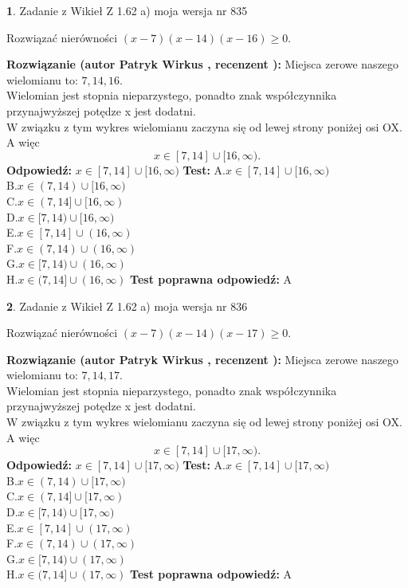 \documentclass[12pt, a4paper]{article}
\theoremstyle{definition} %
\newtheorem{zad}{}
\newcommand{\zadStart}[1]{\begin{zad}#1\newline}
\newcommand{\zadStop}{\end{zad}}
\newcommand{\rozwStart}[2]{\noindent \textbf{Rozwiązanie (autor #1 , recenzent #2): }\newline}
\newcommand{\rozwStop}{\newline}
\newcommand{\odpStart}{\noindent \textbf{Odpowiedź:}\newline}
\newcommand{\odpStop}{\newline}
\newcommand{\testStart}{\noindent \textbf{Test:}\newline}
\newcommand{\testStop}{\newline}
\newcommand{\kluczStart}{\noindent \textbf{Test poprawna odpowiedź:}\newline}
\newcommand{\kluczStop}{\newline}
\begin{document}
\zadStart{Zadanie z Wikieł Z 1.62 a) moja wersja nr 835}

Rozwiązać nierówności $(x-7)(x-14)(x-16)\ge0$.
\zadStop
\rozwStart{Patryk Wirkus}{}
Miejsca zerowe naszego wielomianu to: $7, 14, 16$.\\
Wielomian jest stopnia nieparzystego, ponadto znak współczynnika przy\linebreak najwyższej potędze x jest dodatni.\\ W związku z tym wykres wielomianu zaczyna się od lewej strony poniżej osi OX. A więc $$x \in [7,14] \cup [16,\infty).$$
\rozwStop
\odpStart
$x \in [7,14] \cup [16,\infty)$
\odpStop
\testStart
A.$x \in [7,14] \cup [16,\infty)$\\
B.$x \in (7,14) \cup [16,\infty)$\\
C.$x \in (7,14] \cup [16,\infty)$\\
D.$x \in [7,14) \cup [16,\infty)$\\
E.$x \in [7,14] \cup (16,\infty)$\\
F.$x \in (7,14) \cup (16,\infty)$\\
G.$x \in [7,14) \cup (16,\infty)$\\
H.$x \in (7,14] \cup (16,\infty)$
\testStop
\kluczStart
A
\kluczStop



\zadStart{Zadanie z Wikieł Z 1.62 a) moja wersja nr 836}

Rozwiązać nierówności $(x-7)(x-14)(x-17)\ge0$.
\zadStop
\rozwStart{Patryk Wirkus}{}
Miejsca zerowe naszego wielomianu to: $7, 14, 17$.\\
Wielomian jest stopnia nieparzystego, ponadto znak współczynnika przy\linebreak najwyższej potędze x jest dodatni.\\ W związku z tym wykres wielomianu zaczyna się od lewej strony poniżej osi OX. A więc $$x \in [7,14] \cup [17,\infty).$$
\rozwStop
\odpStart
$x \in [7,14] \cup [17,\infty)$
\odpStop
\testStart
A.$x \in [7,14] \cup [17,\infty)$\\
B.$x \in (7,14) \cup [17,\infty)$\\
C.$x \in (7,14] \cup [17,\infty)$\\
D.$x \in [7,14) \cup [17,\infty)$\\
E.$x \in [7,14] \cup (17,\infty)$\\
F.$x \in (7,14) \cup (17,\infty)$\\
G.$x \in [7,14) \cup (17,\infty)$\\
H.$x \in (7,14] \cup (17,\infty)$
\testStop
\kluczStart
A
\kluczStop
\end{document}
